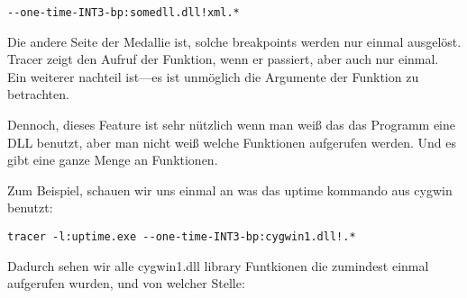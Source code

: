 \begin{lstlisting}
--one-time-INT3-bp:somedll.dll!xml.*
\end{lstlisting}

Die andere Seite der Medallie ist, solche breakpoints werden nur einmal ausgelöst.
Tracer zeigt den Aufruf der Funktion, wenn er passiert, aber auch nur einmal. 
Ein weiterer nachteil ist---es ist unmöglich die Argumente der Funktion zu betrachten.

Dennoch, dieses Feature ist sehr nützlich wenn man weiß das das Programm eine DLL benutzt,
aber man nicht weiß welche Funktionen aufgerufen werden. Und es gibt eine ganze Menge an 
Funktionen.


\par
{}
Zum Beispiel, schauen wir uns einmal an was das uptime kommando aus cygwin benutzt:

\begin{lstlisting}
tracer -l:uptime.exe --one-time-INT3-bp:cygwin1.dll!.*
\end{lstlisting}

Dadurch sehen wir alle cygwin1.dll library Funtkionen die zumindest einmal aufgerufen wurden, und von welcher
Stelle: 


